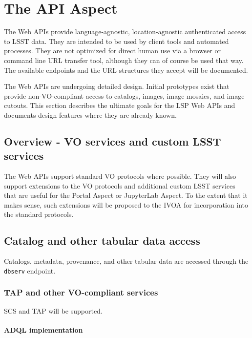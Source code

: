 \section{The API Aspect}\label{api-aspect}

The Web APIs provide language-agnostic, location-agnostic authenticated access
to LSST data.  They are intended to be used by client tools and automated
processes.  They are not optimized for direct human use via a browser or
command line URL transfer tool, although they can of course be used that way.
The available endpoints and the URL structures they accept will be documented.

The Web APIs are undergoing detailed design.  Initial prototypes exist that
provide non-VO-compliant access to catalogs, images, image mosaics, and image
cutouts.  This section describes the ultimate goals for the LSP Web APIs and
documents design features where they are already known.

\subsection{Overview - VO services and custom LSST services}\label{api-overview}

The Web APIs support standard VO protocols where possible.  They will also
support extensions to the VO protocols and additional custom LSST services that
are useful for the Portal Aspect or JupyterLab Aspect.  To the extent that it
makes sense, such extensions will be proposed to the IVOA for incorporation
into the standard protocols.

\subsection{Catalog and other tabular data access}\label{catalog-and-other-tabular-data-access}

Catalogs, metadata, provenance, and other tabular data are accessed through
the \texttt{dbserv} endpoint.

\subsubsection{TAP and other VO-compliant services}\label{tap-and-other-vo-compliant-services}

SCS and TAP will be supported.

\paragraph{ADQL implementation}\label{adql-implementation}

